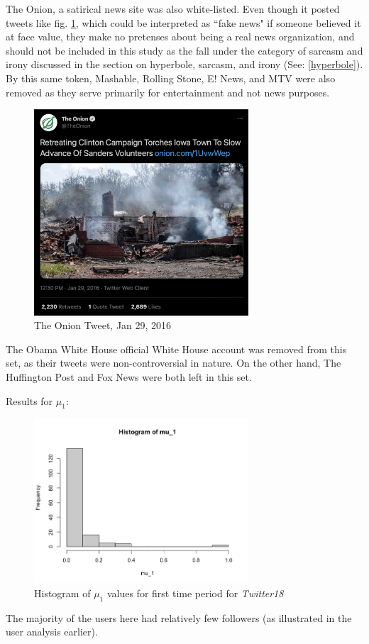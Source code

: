 \documentclass[preprint,review,12pt]{elsarticle}
\begin{document}
The Onion, a satirical news site was also white-listed. Even though it posted tweets like fig. \ref{fig:The Onion Tweet, Jan 29, 2016}, which could be interpreted as ``fake news" if someone believed it at face value, they make no pretenses about being a real news organization, and should not be included in this study as the fall under the category of sarcasm and irony discussed in the section on hyperbole, sarcasm, and irony (See: \ref{hyperbole}). By this same token, Mashable, Rolling Stone, E! News, and MTV were also removed as they serve primarily for entertainment and not news purposes.
\begin{figure}[h]
    \centering
    \includegraphics[width=8cm]{Onion Tweet.png}
    \caption{The Onion Tweet, Jan 29, 2016 \cite{onion2016tweet}}
    \label{fig:The Onion Tweet, Jan 29, 2016}
\end{figure}

The Obama White House official White House account was removed from this set, as their tweets were non-controversial in nature. On the other hand, The Huffington Post and Fox News were both left in this set.

Results for $\mu_1$:
\begin{figure}[h]
    \centering
    \includegraphics[width=8cm]{Histogram of mu_1 twitter15.png}
    \caption{Histogram of $\mu_1$ values for first time period for \textit{Twitter18}}
    \label{fig:Hist mu_1 Twitter18}
\end{figure}
The majority of the users here had relatively few followers (as illustrated in the user analysis earlier). 
\end{document}

